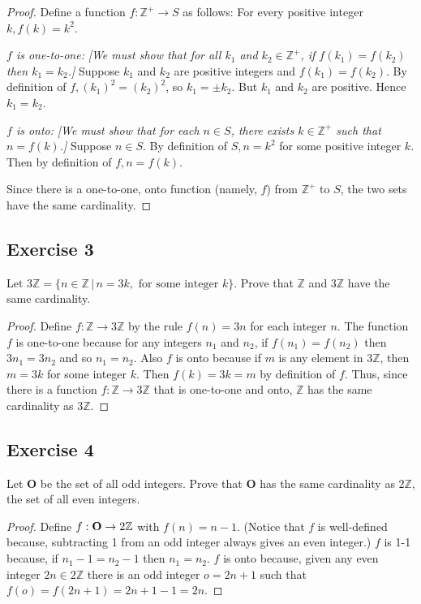 \documentclass[14pt]{extarticle}
\newcommand{\Z}{\mathbb{Z}}
\begin{document}
\begin{proof}
Define a function \(f: \Z^+ \to S\) as follows: For every positive integer \(k, f(k) = k^2\). 

{\it $f$ is one-to-one:} {\it [We must show that for all $k_1$ and \(k_2 \in \Z^+\), if \(f(k_1) = f(k_2)\) then 
\(k_1 = k_2\).]} Suppose $k_1$ and $k_2$ are positive integers and \(f(k_1) = f(k_2)\). By definition of \(f, (k_1)^2 = (k_2)^2\), so \(k_1 = \pm k_2\). But $k_1$ and $k_2$ are positive. Hence \(k_1 = k_2\).

{\it $f$ is onto:} {\it [We must show that for each \(n \in S\), there exists \(k \in \Z^+\) such that \(n = f(k)\).]} 
Suppose \(n \in S\). By definition of \(S, n = k^2\) for some positive integer $k$. Then by definition of \(f, n = f(k)\).

Since there is a one-to-one, onto function (namely, $f$) from $\Z^+$ to $S$, the two sets have the same cardinality.
\end{proof}

\subsection{Exercise 3}
Let \(3\Z = \{n \in \Z \,|\, n = 3k, \text{ for some integer } k\}\). Prove that $\Z$ and $3\Z$ have the same 
cardinality.

\begin{proof}
Define \(f: \Z \to 3\Z\) by the rule \(f(n) = 3n\) for each integer $n$. The function $f$ is one-to-one because for any 
integers $n_1$ and $n_2$, if \(f(n_1) = f(n_2)\) then \(3n_1 = 3n_2\) and so \(n_1 = n_2\). Also $f$ is onto 
because if $m$ is any element in $3\Z$, then \(m = 3k\) for some integer $k$. Then \(f(k) = 3k = m\) by definition of 
$f$. Thus, since there is a function \(f: \Z \to 3\Z\) that is one-to-one and onto, $\Z$ has the same cardinality as $3\Z$.
\end{proof}

\subsection{Exercise 4}
Let {\bf O} be the set of all odd integers. Prove that {\bf O} has the same cardinality as $2\Z$, the set of all even
integers.

\begin{proof}
Define \(f: {\bf O} \to 2\Z\) with \(f(n) = n-1\). (Notice that $f$ is well-defined because, subtracting 1 from an odd 
integer always gives an even integer.) $f$ is 1-1 because, if \(n_1 - 1 = n_2 - 1\) then \(n_1 = n_2\). $f$ is onto 
because, given any even integer \(2n \in 2\Z\) there is an odd integer \(o = 2n+1\) such that 
\(f(o) = f(2n+1) = 2n+1-1 = 2n\).
\end{proof}
\end{document}
